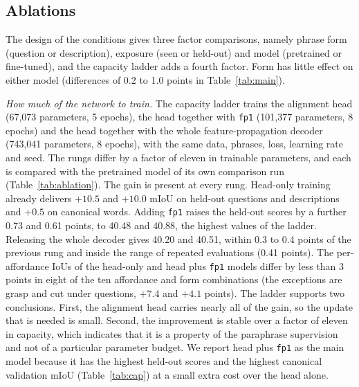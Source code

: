 \documentclass[conference]{IEEEtran}
\begin{document}
\subsection{Ablations}
\label{sec:ablation}
The design of the conditions gives three factor comparisons, namely phrase form (question or description), exposure (seen or held-out) and model (pretrained or fine-tuned), and the capacity ladder adds a fourth factor. Form has little effect on either model (differences of 0.2 to 1.0 points in Table~\ref{tab:main}).

\emph{How much of the network to train.} The capacity ladder trains the alignment head (67,073 parameters, 5 epochs), the head together with \texttt{fp1} (101,377 parameters, 8 epochs) and the head together with the whole feature-propagation decoder (743,041 parameters, 8 epochs), with the same data, phrases, loss, learning rate and seed. The rungs differ by a factor of eleven in trainable parameters, and each is compared with the pretrained model of its own comparison run (Table~\ref{tab:ablation}). The gain is present at every rung. Head-only training already delivers $+10.5$ and $+10.0$ mIoU on held-out questions and descriptions and $+0.5$ on canonical words. Adding \texttt{fp1} raises the held-out scores by a further 0.73 and 0.61 points, to 40.48 and 40.88, the highest values of the ladder. Releasing the whole decoder gives 40.20 and 40.51, within 0.3 to 0.4 points of the previous rung and inside the range of repeated evaluations (0.41 points). The per-affordance IoUs of the head-only and head plus \texttt{fp1} models differ by less than 3 points in eight of the ten affordance and form combinations (the exceptions are grasp and cut under questions, $+7.4$ and $+4.1$ points). The ladder supports two conclusions. First, the alignment head carries nearly all of the gain, so the update that is needed is small. Second, the improvement is stable over a factor of eleven in capacity, which indicates that it is a property of the paraphrase supervision and not of a particular parameter budget. We report head plus \texttt{fp1} as the main model because it has the highest held-out scores and the highest canonical validation mIoU (Table~\ref{tab:cap}) at a small extra cost over the head alone.
\end{document}
